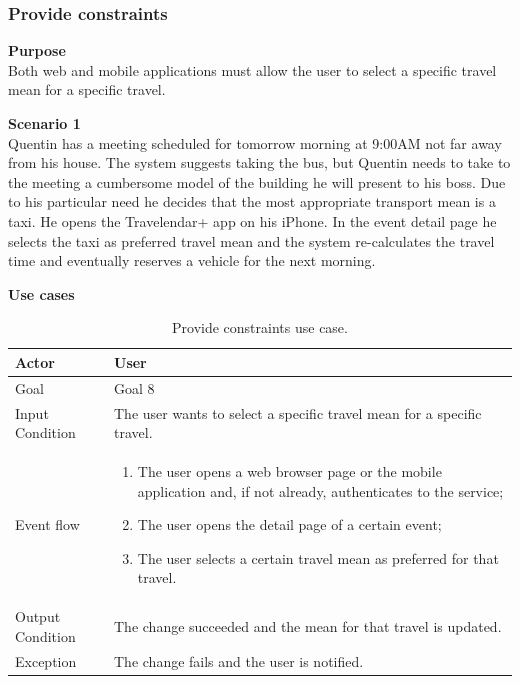 \documentclass{article}
\begin{document}
	\subsubsection{Provide constraints}
	
	\bigskip
	\noindent
	\textbf{Purpose} \\
	Both web and mobile applications must allow the user to select a specific travel mean for a specific travel.
	
	\bigskip
	\noindent
	\textbf{Scenario 1} \\
	Quentin has a meeting scheduled for tomorrow morning at 9:00AM not far away from his house. The system suggests taking the bus, but Quentin needs to take to the meeting a cumbersome model of the building he will present to his boss. Due to his particular need he decides that the most appropriate transport mean is a taxi. He opens the Travelendar+ app on his iPhone. In the event detail page he selects the taxi as preferred travel mean and the system re-calculates the travel time and eventually reserves a vehicle for the next morning.
	
	\bigskip
	\noindent
	\textbf{Use cases} \\
	
	\begin{table}[htp]
	\caption{Provide constraints use case.}
		\begin{center}
    			\begin{tabular}{p{}|p{}}

   			 	\hline
    				Actor & User \\ \hline
    				Goal & Goal 8 \\ \hline
    				Input Condition & The user wants to select a specific travel mean for a specific travel. \\ \hline
    				Event flow & 
				\begin{enumerate}
  					\item The user opens a web browser page or the mobile application and, if not already, authenticates to the service;
  					\item The user opens the detail page of a certain event;
  					\item The user selects a certain travel mean as preferred for that travel.
 				 \end{enumerate} \\ \hline
    				Output Condition & The change succeeded and the mean for that travel is updated. \\ \hline
    				Exception & The change fails and the user is notified. \\ \hline
    			\end{tabular}
		\end{center}
	\end{table}
	
\end{document}
